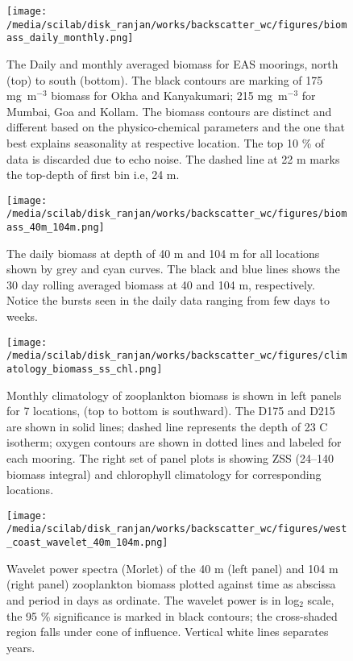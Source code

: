 \documentclass{article}
\begin{document}
\newpage

\begin{figure}[htbp]
	\centering
	\texttt{[image: /media/scilab/disk\_ranjan/works/backscatter\_wc/figures/biomass\_daily\_monthly.png]} 
	\captionsetup{justification=justified,font=footnotesize,skip=0.05\baselineskip,width=\textwidth}
	\caption{The Daily and monthly averaged biomass for EAS moorings, north (top) to south (bottom). The black contours are marking of 175 mg~m$^{-3}$ biomass for Okha and Kanyakumari; 215 mg~m$^{-3}$  for Mumbai, Goa and Kollam. The biomass contours are distinct and different based on the physico-chemical parameters and the one that best explains seasonality at respective location.  The top 10 \% of data is discarded due to echo noise. The dashed line at 22 m marks the top-depth of first bin i.e, 24 m.}
	\label{fig:dailynmonthly}
\end{figure}

\begin{figure}[htbp]
	\centering
	\texttt{[image: /media/scilab/disk\_ranjan/works/backscatter\_wc/figures/biomass\_40m\_104m.png]} 
	\captionsetup{justification=justified,font=footnotesize,skip=0.05\baselineskip,width=\textwidth}
	\caption{The daily biomass at depth of 40 m and 104 m for all locations shown by grey and cyan curves. The black and blue lines shows the 30 day rolling averaged biomass at 40 and 104 m, respectively. Notice the bursts seen in the daily data ranging from few days to weeks.}
	\label{fig:compfourty}
\end{figure}


\begin{figure}[htbp]
	\centering
	\texttt{[image: /media/scilab/disk\_ranjan/works/backscatter\_wc/figures/climatology\_biomass\_ss\_chl.png]} 
	\captionsetup{justification=justified,font=footnotesize,skip=0.05\baselineskip,width=\textwidth}
	\caption{Monthly climatology of zooplankton biomass is shown in left panels for 7 locations, (top to bottom is southward). The D175 and D215 are shown in solid lines; dashed line represents the depth of 23 C isotherm; oxygen contours are shown in dotted lines and labeled for each mooring. The right set of panel plots is showing ZSS (24--140 biomass integral) and chlorophyll climatology for corresponding locations.}
	\label{fig:zsschlclim}
\end{figure}



\begin{figure}[htbp]
	\centering
	\texttt{[image: /media/scilab/disk\_ranjan/works/backscatter\_wc/figures/west\_coast\_wavelet\_40m\_104m.png]} 
	\captionsetup{justification=justified,font=footnotesize,skip=0.05\baselineskip,width=\textwidth}
	\caption{Wavelet power spectra (Morlet) of the 40 m (left panel) and 104 m (right panel) zooplankton biomass plotted against time as abscissa and period in days as ordinate. The wavelet power is in log$_2$ scale, the 95 \% significance is marked in black contours; the cross-shaded region falls under cone of influence. Vertical white lines separates years.}
	\label{fig:wave40104}
\end{figure}
\end{document}
